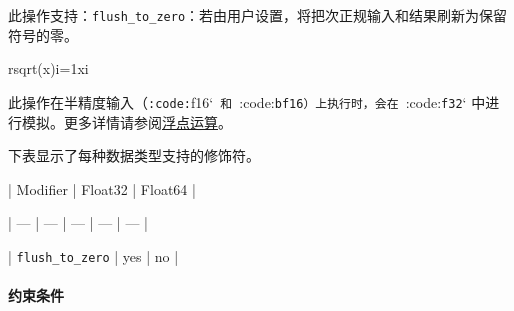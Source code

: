 \documentclass{article}
\begin{document}
此操作支持：\texttt{flush\_to\_zero}：若由用户设置，将把次正规输入和结果刷新为保留符号的零。



rsqrt(x)i=1xi


此操作在半精度输入（\texttt{:code:}f16`\texttt{ 和 }:code:\texttt{bf16}\texttt{）上执行时，会在 }:code:\texttt{f32}` 中进行模拟。更多详情请参阅\href{https://docs.nvidia.com/cuda/tile-ir/latest/sections/operations.html#op-group-floating-point}{浮点运算}。



下表显示了每种数据类型支持的修饰符。



| Modifier | Float32 | Float64 |


| --- | --- | --- | --- | --- |


| \texttt{flush\_to\_zero} | yes | no |






\paragraph{约束条件}
\end{document}
